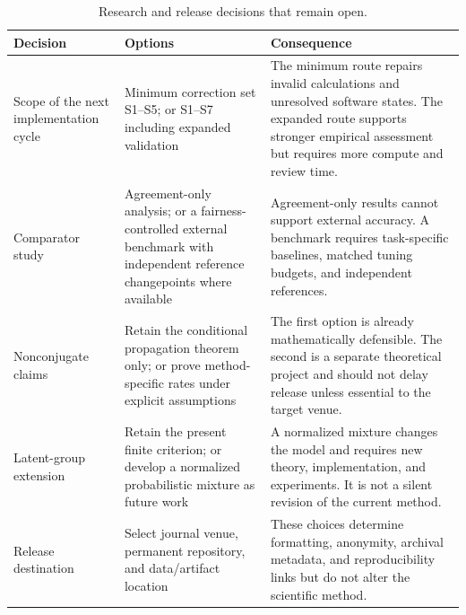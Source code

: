\begin{table}[H]
\centering
\small
\begin{tabularx}{0.96\textwidth}{@{}p{}p{}X@{}}
\toprule
\textbf{Decision} & \textbf{Options} & \textbf{Consequence} \\
\midrule
Scope of the next implementation cycle & Minimum correction set S1--S5; or S1--S7 including expanded validation & The minimum route repairs invalid calculations and unresolved software states. The expanded route supports stronger empirical assessment but requires more compute and review time. \\
Comparator study & Agreement-only analysis; or a fairness-controlled external benchmark with independent reference changepoints where available & Agreement-only results cannot support external accuracy. A benchmark requires task-specific baselines, matched tuning budgets, and independent references. \\
Nonconjugate claims & Retain the conditional propagation theorem only; or prove method-specific rates under explicit assumptions & The first option is already mathematically defensible. The second is a separate theoretical project and should not delay release unless essential to the target venue. \\
Latent-group extension & Retain the present finite criterion; or develop a normalized probabilistic mixture as future work & A normalized mixture changes the model and requires new theory, implementation, and experiments. It is not a silent revision of the current method. \\
Release destination & Select journal venue, permanent repository, and data/artifact location & These choices determine formatting, anonymity, archival metadata, and reproducibility links but do not alter the scientific method. \\
\bottomrule
\end{tabularx}
\caption{Research and release decisions that remain open.}
\label{tab:exec-decisions}
\end{table}
